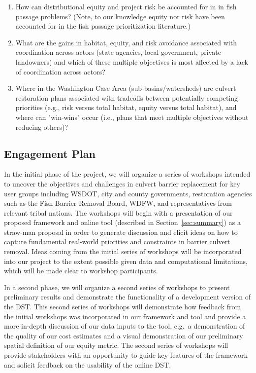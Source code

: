 \documentclass[12pt]{elsarticle}
\begin{document}
	\begin{enumerate}
		\item How can distributional equity and project risk be accounted for in in fish passage problems? (Note, to our knowledge equity nor risk have been accounted for in the fish passage prioritization literature.)
		\item What are the gains in habitat, equity, and risk avoidance associated with coordination across actors (state agencies, local government, private landowners) and which of these multiple objectives is most affected by a lack of coordination across actors?
		\item Where in the Washington Case Area (sub-basins/watersheds) are culvert restoration plans associated with tradeoffs between potentially competing priorities (e.g., risk versus total habitat, equity versus total habitat), and where can "win-wins" occur (i.e., plans that meet multiple objectives without reducing others)?
	\end{enumerate}
	
	\subsection{Engagement Plan}\label{sec:engage}
	
	In the initial phase of the project, we will organize a series of workshops intended to uncover the objectives and challenges in culvert barrier replacement for key user groups including WSDOT, city and county governments, restoration agencies such as the Fish Barrier Removal Board, WDFW, and representatives from relevant tribal nations. The workshops will begin with a presentation of our proposed framework and online tool (described in Section~\ref{sec:summary}) as a straw-man proposal in order to generate discussion and elicit ideas on how to capture fundamental real-world priorities and constraints in barrier culvert removal. Ideas coming from the initial series of workshops will be incorporated into our project to the extent possible given data and computational limitations, which will be made clear to workshop participants.
	
	In a second phase, we will organize a second series of workshops to present preliminary results and demonstrate the functionality of a development version of the DST. This second series of workshops will demonstrate how feedback from the initial workshops was incorporated in our framework and tool and provide a more in-depth discussion of our data inputs to the tool, e.g.\ a demonstration of the quality of our cost estimates and a visual demonstration of our preliminary spatial definition of our equity metric. The second series of workshops will provide stakeholders with an opportunity to guide key features of the framework and solicit feedback on the usability of the online DST.
	
\end{document}

